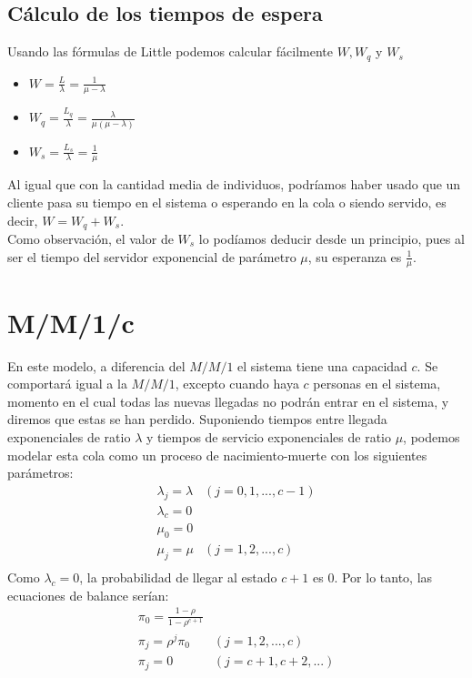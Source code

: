 	\subsection{C\'alculo de los tiempos de espera}
	Usando las f\'ormulas de Little podemos calcular f\'acilmente $W,W_q$ y $W_s$
		\begin{itemize}
			\item $W=\displaystyle\frac{L}{\lambda}=\frac{1}{\mu-\lambda}$
			\item $W_q=\displaystyle\frac{L_q}{\lambda}=\frac{\lambda}{\mu(\mu-\lambda)}$
			\item$W_s=\displaystyle\frac{L_s}{\lambda}=\frac{1}{\mu}$
		\end{itemize}
	\hspace{0.5cm}Al igual que con la cantidad media de individuos, podr\'iamos haber usado que un cliente pasa su tiempo en el sistema o esperando en la cola o siendo servido, es decir, $W=W_q+W_s$. \\
	\hspace{0.5cm}Como observaci\'on, el valor de $W_s$ lo pod\'iamos deducir desde un principio, pues al ser el tiempo del servidor exponencial de par\'ametro $\mu$, su esperanza es $\displaystyle \frac{1}{\mu}$.
	
\section{M/M/1/c}
		En este modelo, a diferencia del $M/M/1$ el sistema tiene una capacidad $c$. Se comportará igual a la $M/M/1$, excepto cuando haya $c$ personas en el sistema, momento en el cual todas las nuevas llegadas no podrán entrar en el sistema, y diremos que estas se han perdido. Suponiendo tiempos entre llegada exponenciales de ratio $\lambda$ y tiempos de servicio exponenciales de ratio $\mu$, podemos modelar esta cola como un proceso de nacimiento-muerte con los siguientes par\'ametros:
		$$\begin{array}{cc}
		\lambda_j=\lambda & (j=0,1,...,c-1)\\
		\lambda_c=0 & \\
		\mu_0=0 &  \\
		\mu_j=\mu &  (j=1,2,...,c)\\
		\end{array}$$
		\hspace{0.5cm} Como $\lambda_c=0$, la probabilidad de llegar al estado $c+1$ es $0$. Por lo tanto, las ecuaciones de balance ser\'ian:
			$$\begin{array}{cc}
		\pi_0=\displaystyle\frac{1-\rho}{1-\rho^{c+1}} & \\
		\pi_j=\rho^j\pi_0 & (j=1,2,...,c)\\
		\pi_j=0 & (j=c+1,c+2,...)\\
		\end{array}$$
